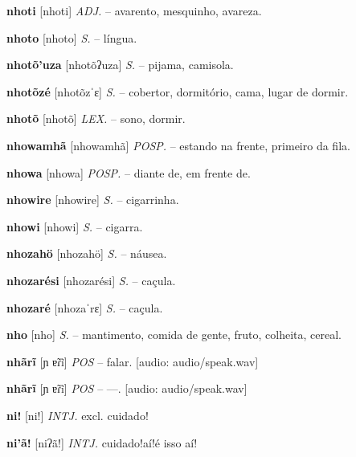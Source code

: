 \textbf{nhoti} [nhoti] \textit{ADJ.} -- avarento, mesquinho, avareza.

\textbf{nhoto} [nhoto] \textit{S.} -- língua.

\textbf{nhotõ'uza} [nhotõʔuza] \textit{S.} -- pijama, camisola.

\textbf{nhotõzé} [nhotõzˈɛ] \textit{S.} -- cobertor, dormitório, cama, lugar de dormir.

\textbf{nhotõ} [nhotõ] \textit{LEX.} -- sono, dormir.

\textbf{nhowamhã} [nhowamhã] \textit{POSP.} -- estando na frente, primeiro da fila.

\textbf{nhowa} [nhowa] \textit{POSP.} -- diante de, em frente de.

\textbf{nhowire} [nhowire] \textit{S.} -- cigarrinha.

\textbf{nhowi} [nhowi] \textit{S.} -- cigarra.

\textbf{nhozahö} [nhozahö] \textit{S.} -- náusea.

\textbf{nhozarési} [nhozarési] \textit{S.} -- caçula.

\textbf{nhozaré} [nhozaˈrɛ] \textit{S.} -- caçula.

\textbf{nho} [nho] \textit{S.} -- mantimento, comida de gente, fruto, colheita, cereal.

\textbf{nhãrĩ} [ɲ ɐ̃ɾĩ] \textit{POS} -- falar. [audio: audio/speak.wav]{\faHeadphones}

\textbf{nhãrĩ} [ɲ ɐ̃ɾĩ] \textit{POS} -- —. [audio: audio/speak.wav]{\faHeadphones}

\textbf{ni!} [ni!] \textit{INTJ.} excl. cuidado!

\textbf{ni'ã!} [niʔã!] \textit{INTJ.} cuidado!aí!é isso aí!

